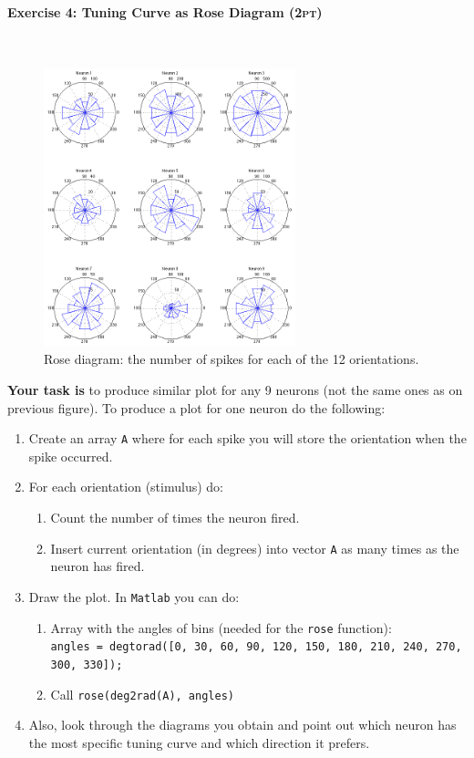\documentclass[a4paper,11pt]{article}
\newenvironment{exercise}[3]{\paragraph{Exercise #1: #2 \textsc{(#3pt)}}\ \\}{
\medskip}
\begin{document}
\begin{exercise}{4}{Tuning Curve as Rose Diagram}{2}
\begin{figure}[H]
   \centering
   \includegraphics[width=0.65\textwidth]{rosediag.png} 
   \caption{Rose diagram: the number of spikes for each of the 12 orientations.}
   \label{fig:rosediag}
\end{figure}

\textbf{Your task is} to produce similar plot for any 9 neurons (not the same ones as on previous figure). To produce a plot for one neuron do the following:
\begin{enumerate}
	\item Create an array \texttt{A} where for each spike you will store the orientation when the spike occurred.
	\item For each orientation (stimulus) do:
	\begin{enumerate}
		\item Count the number of times the neuron fired.
		\item Insert current orientation (in degrees) into vector \texttt{A} as many times as the neuron has fired.
	\end{enumerate}
	\item Draw the plot. In \texttt{Matlab} you can do:
	\begin{enumerate}
		\item Array with the angles of bins (needed for the \texttt{rose} function):\\ \texttt{angles = degtorad([0, 30, 60, 90, 120, 150, 180, 210, 240, 270, 300, 330]);}
		\item Call \texttt{rose(deg2rad(A), angles)}
	\end{enumerate}
	\item Also, look through the diagrams you obtain and point out which neuron has the most specific tuning curve and which direction it prefers.
\end{enumerate}
\end{exercise}
\end{document}
